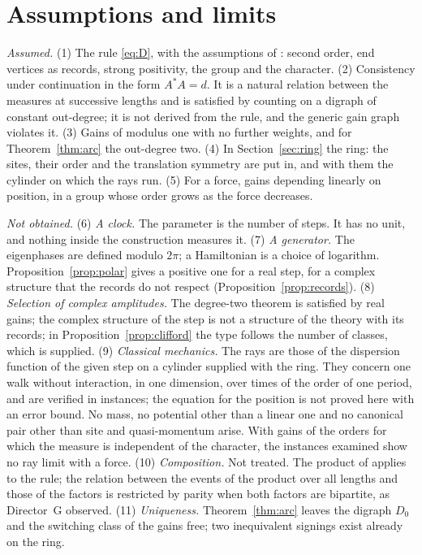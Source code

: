 \section{Assumptions and limits}\label{sec:limits}

\emph{Assumed.} (1) The rule \eqref{eq:D}, with the assumptions of \cite{g8}: second order, end vertices as records, strong positivity, the group and the character. (2) Consistency under continuation in the form $A^*A=d$. It is a natural relation between the measures at successive lengths and is satisfied by counting on a digraph of constant out-degree; it is not derived from the rule, and the generic gain graph violates it. (3) Gains of modulus one with no further weights, and for Theorem~\ref{thm:arc} the out-degree two. (4) In Section~\ref{sec:ring} the ring: the sites, their order and the translation symmetry are put in, and with them the cylinder on which the rays run. (5) For a force, gains depending linearly on position, in a group whose order grows as the force decreases.

\emph{Not obtained.} (6) \emph{A clock.} The parameter is the number of steps. It has no unit, and nothing inside the construction measures it. (7) \emph{A generator.} The eigenphases are defined modulo $2\pi$; a Hamiltonian is a choice of logarithm. Proposition~\ref{prop:polar} gives a positive one for a real step, for a complex structure that the records do not respect (Proposition~\ref{prop:records}). (8) \emph{Selection of complex amplitudes.} The degree-two theorem is satisfied by real gains; the complex structure of the step is not a structure of the theory with its records; in Proposition~\ref{prop:clifford} the type follows the number of classes, which is supplied. (9) \emph{Classical mechanics.} The rays are those of the dispersion function of the given step on a cylinder supplied with the ring. They concern one walk without interaction, in one dimension, over times of the order of one period, and are verified in instances; the equation for the position is not proved here with an error bound. No mass, no potential other than a linear one and no canonical pair other than site and quasi-momentum arise. With gains of the orders for which the measure is independent of the character, the instances examined show no ray limit with a force. (10) \emph{Composition.} Not treated. The product of \cite{g8} applies to the rule; the relation between the events of the product over all lengths and those of the factors is restricted by parity when both factors are bipartite, as Director~G observed. (11) \emph{Uniqueness.} Theorem~\ref{thm:arc} leaves the digraph $D_0$ and the switching class of the gains free; two inequivalent signings exist already on the ring.

